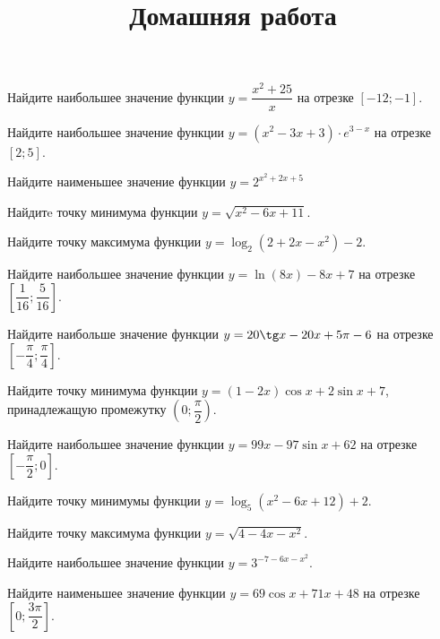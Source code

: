 \begin{consultation}
	\begin{listofex}
		\item Найдите наибольшее значение функции \( y=\dfrac{x^2+25}{x} \) на отрезке \( [-12;-1] \).
		\item Найдите наибольшее значение функции \( y=(x^2-3x+3)\cdot e^{3-x} \) на отрезке \( [2;5] \).
		\item Найдите наименьшее значение функции \( y=2^{x^2+2x+5} \)
		\item Найдитe точку минимума функции \( y=\sqrt{x^2-6x+11} \).
		\item Найдите точку максимума функции \( y=\log_2(2+2x-x^2)-2 \).
		\item Найдите наибольшее значение функции \( y=\ln(8x)-8x+7 \) на отрезке \( \left[ \dfrac{1}{16};\dfrac{5}{16} \right] \).
		\item Найдите наибольше значение функции \( y=20\tg x-20x+5\pi-6 \) на отрезке \( 	\left[-\dfrac{\pi}{4}; \dfrac{\pi}{4}\right] \).
		\item Найдите точку минимума функции \( y=(1-2x)\cos x+2\sin x+7 \), принадлежащую промежутку \( \left( 0;\dfrac{\pi}{2} \right) \).
		\item Найдите наибольшее значение функции \( y=99x-97\sin x+62 \) на отрезке \( \left[-\dfrac{\pi}{2};0\right] \).
	\end{listofex}
	\newpage
	\title{Домашняя работа}
	\begin{listofex}
		\item Найдите точку минимумы функции \( y=\log_5(x^2-6x+12)+2 \).
		\item Найдите точку максимума функции \( y=\sqrt{4-4x-x^2} \).
		\item Найдите наибольшее значение функции \( y=3^{-7-6x-x^2} \).
		\item Найдите наименьшее значение функции \( y=69\cos x+71x+48 \) на отрезке \( \left[0;\dfrac{3\pi}{2}\right] \).
	\end{listofex}
\end{consultation}

